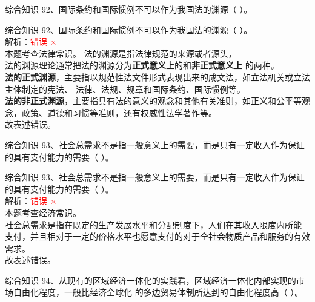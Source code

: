 \documentclass[aspectratio=169]{beamer}
\begin{document}
\begin{frame}[t]{综合知识}
    92、国际条约和国际惯例不可以作为我国法的渊源（ ）。
\end{frame}                           

\begin{frame}[t]{综合知识}
    92、国际条约和国际惯例不可以作为我国法的渊源（ ）。\\
    解析：\textcolor{red}{错误 $\times$}\\
    本题考查法律常识。
    法的渊源是指法律规范的来源或者源头，\\
    法的渊源理论通常把法的渊源分为\textbf{正式意义上}的和\textbf{非正式意义上}
    的两种。\\
    \textbf{法的正式渊源}，主要指以规范性法文件形式表现出来的成文法，如立法机关或立法主体制定的宪法、
    法律、法规、规章和国际条约、国际惯例等。\\
    \textbf{法的非正式渊源}，主要指具有法的意义的观念和其他有关准则，如正义和公平等观念，政策、道德和习惯等准则，还有权威性法学著作等。\\
    故表述错误。
\end{frame}                           




\begin{frame}[t]{综合知识}
    93、社会总需求不是指一般意义上的需要，而是只有一定收入作为保证的具有支付能力的需要（ ）。
\end{frame}                           

\begin{frame}[t]{综合知识}
    93、社会总需求不是指一般意义上的需要，而是只有一定收入作为保证的具有支付能力的需要（ ）。\\
    解析：\textcolor{red}{错误 $\times$}\\
    本题考查经济常识。\\
    社会总需求是指在既定的生产发展水平和分配制度下，人们在其收入限度内所能
    支付，并且相对于一定的价格水平也愿意支付的对于全社会物质产品和服务的有效需求。\\
    故表述错误。
\end{frame}                           



\begin{frame}[t]{综合知识}
    94、从现有的区域经济一体化的实践看，区域经济一体化内部实现的市场自由化程度，一般比经济全球化
    的多边贸易体制所达到的自由化程度高（ ）。
\end{frame}                           
\end{document}
